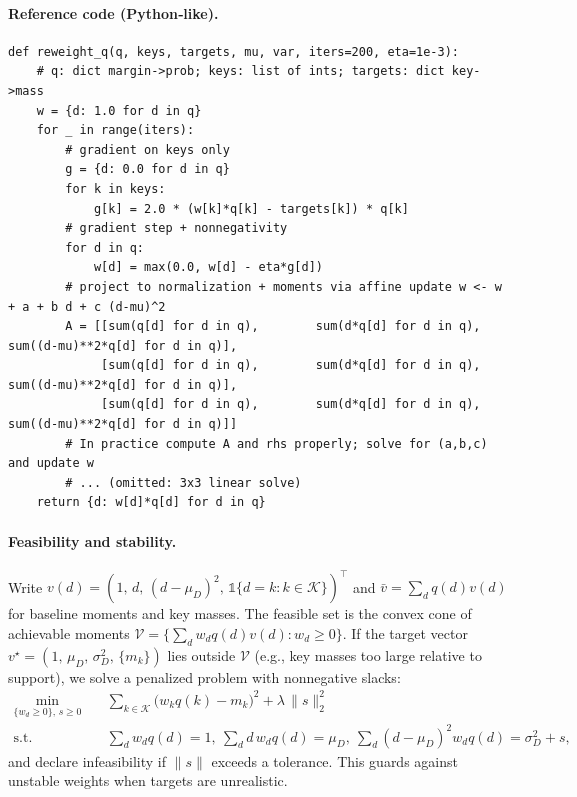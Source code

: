 \paragraph{Reference code (Python‑like).}
\begin{verbatim}
def reweight_q(q, keys, targets, mu, var, iters=200, eta=1e-3):
    # q: dict margin->prob; keys: list of ints; targets: dict key->mass
    w = {d: 1.0 for d in q}
    for _ in range(iters):
        # gradient on keys only
        g = {d: 0.0 for d in q}
        for k in keys:
            g[k] = 2.0 * (w[k]*q[k] - targets[k]) * q[k]
        # gradient step + nonnegativity
        for d in q:
            w[d] = max(0.0, w[d] - eta*g[d])
        # project to normalization + moments via affine update w <- w + a + b d + c (d-mu)^2
        A = [[sum(q[d] for d in q),        sum(d*q[d] for d in q),        sum((d-mu)**2*q[d] for d in q)],
             [sum(q[d] for d in q),        sum(d*q[d] for d in q),        sum((d-mu)**2*q[d] for d in q)],
             [sum(q[d] for d in q),        sum(d*q[d] for d in q),        sum((d-mu)**2*q[d] for d in q)]]
        # In practice compute A and rhs properly; solve for (a,b,c) and update w
        # ... (omitted: 3x3 linear solve)
    return {d: w[d]*q[d] for d in q}
\end{verbatim}

\paragraph{Feasibility and stability.}\label{subsec:key-feas}
Write $v(d)=(1,\,d,\,(d-\mu_D)^2,\,\mathbb{1}\{d=k: k\in\mathcal{K}\})^\top$ and $\bar v=\sum_d q(d) v(d)$ for baseline moments and key masses. The feasible set is the convex cone of achievable moments $\mathcal{V}=\{\sum_d w_d q(d) v(d): w_d\ge0\}$. If the target vector $v^\star=(1,\,\mu_D,\,\sigma_D^2,\,\{m_k\})$ lies outside $\mathcal{V}$ (e.g., key masses too large relative to support), we solve a penalized problem with nonnegative slacks:
\begin{align*}
\min_{\{w_d\ge0\},\,s\ge0}\quad & \sum_{k\in\mathcal{K}} \big(w_k q(k)-m_k\big)^2 + \lambda\,\|s\|_2^2\\
\text{s.t.}\quad & \sum_d w_d q(d)=1,\ \sum_d d\,w_d q(d)=\mu_D,\ \sum_d (d-\mu_D)^2 w_d q(d)=\sigma_D^2+s,
\end{align*}
and declare infeasibility if $\|s\|$ exceeds a tolerance. This guards against unstable weights when targets are unrealistic.

